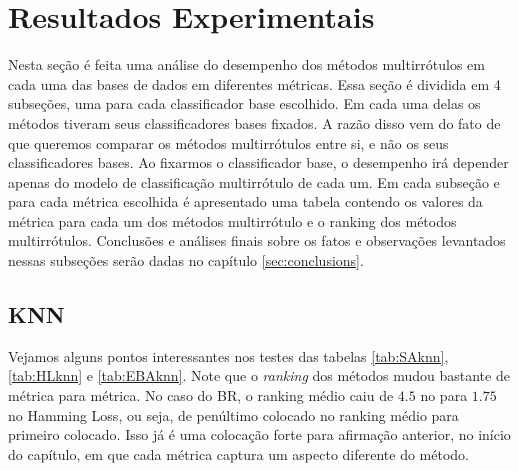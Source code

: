 

% 


\section{Resultados Experimentais}
Nesta seção é feita uma análise do desempenho dos métodos multirrótulos em cada uma das bases de dados
em diferentes métricas.
Essa seção é dividida em 4 subseções, uma para cada classificador base escolhido. Em cada uma
delas os métodos tiveram seus classificadores bases fixados.
A razão disso vem do fato de que queremos comparar os métodos multirrótulos entre si, e não os seus classificadores
bases.
Ao fixarmos o classificador base, 
o desempenho irá depender apenas do modelo de classificação multirrótulo
de cada um.
Em cada subseção e para cada métrica escolhida é apresentado uma tabela
contendo os valores da métrica para cada um dos métodos multirrótulo e
o ranking dos métodos multirrótulos. Conclusões e análises finais sobre
os fatos e observações levantados nessas subseções serão
dadas no capítulo \ref{sec:conclusions}.


% 
% 

\subsection{KNN}





Vejamos alguns pontos interessantes nos testes das tabelas
\ref{tab:SAknn},\ref{tab:HLknn} e \ref{tab:EBAknn}.
Note que o \textit{ranking} dos métodos mudou bastante de métrica para métrica.
No caso do BR, o ranking médio caiu de $4.5$ no \SA para $1.75$ no Hamming Loss, ou seja,
de penúltimo colocado no ranking médio para primeiro colocado. 
Isso já é uma colocação forte para afirmação anterior, no início do capítulo, em que 
cada métrica captura um aspecto diferente do método. 



